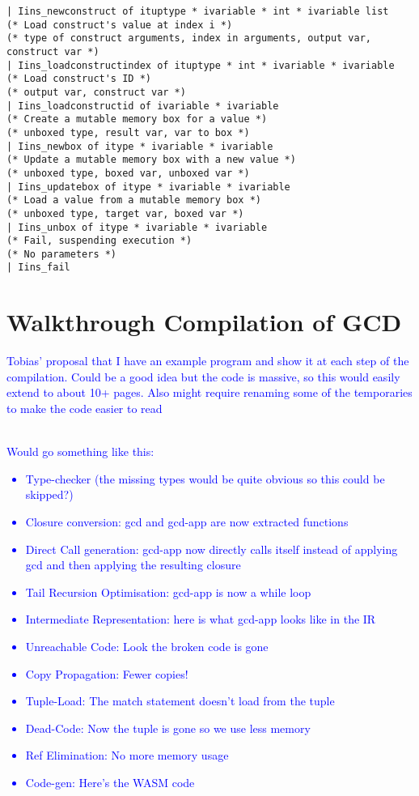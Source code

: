 \documentclass[12pt,twoside,notitlepage]{report}
\newcommand\note[1]{\textcolor{blue}{#1}}
\begin{document}
\begin{verbatim}
| Iins_newconstruct of ituptype * ivariable * int * ivariable list
(* Load construct's value at index i *)
(* type of construct arguments, index in arguments, output var, construct var *)
| Iins_loadconstructindex of ituptype * int * ivariable * ivariable
(* Load construct's ID *)
(* output var, construct var *)
| Iins_loadconstructid of ivariable * ivariable
(* Create a mutable memory box for a value *)
(* unboxed type, result var, var to box *)
| Iins_newbox of itype * ivariable * ivariable
(* Update a mutable memory box with a new value *)
(* unboxed type, boxed var, unboxed var *)
| Iins_updatebox of itype * ivariable * ivariable
(* Load a value from a mutable memory box *)
(* unboxed type, target var, boxed var *)
| Iins_unbox of itype * ivariable * ivariable
(* Fail, suspending execution *)
(* No parameters *)
| Iins_fail
\end{verbatim}

\clearpage
\chapter{Walkthrough Compilation of GCD}
\note{Tobias' proposal that I have an example program and show it at each step of the compilation. Could be a good idea but the code is massive, so this would easily extend to about 10+ pages. Also might require renaming some of the temporaries to make the code easier to read}
\\\\
\note{Would go something like this:
\begin{itemize}
	\item Type-checker (the missing types would be quite obvious so this could be skipped?)
	\item Closure conversion: gcd and gcd-app are now extracted functions
	\item Direct Call generation: gcd-app now directly calls itself instead of applying gcd and then applying the resulting closure
	\item Tail Recursion Optimisation: gcd-app is now a while loop
	\item Intermediate Representation: here is what gcd-app looks like in the IR
	\item Unreachable Code: Look the broken code is gone
	\item Copy Propagation: Fewer copies!
	\item Tuple-Load: The match statement doesn't load from the tuple
	\item Dead-Code: Now the tuple is gone so we use less memory
	\item Ref Elimination: No more memory usage
	\item Code-gen: Here's the WASM code
\end{itemize}
}
\end{document}
